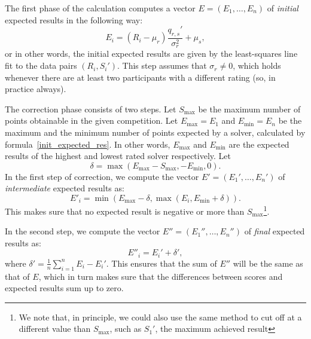 \documentclass{article}
\newcommand{\artg}{\mu_r}
\newcommand{\ascr}{\mu_s}
\newcommand{\vrtg}{\sigma_r}
\newcommand{\cov}{q_{r,s}}
\theoremstyle{definition}
\begin{document}
The first phase of the calculation computes a vector $E=(E_1,\ldots,E_n)$ of \emph{initial} expected results in the following way:
\begin{equation}\label{init_expected_res}
E_i= (R_i - \artg) \frac{\cov'}{\vrtg^2} + \ascr,
\end{equation}
or in other words, the initial expected results are given by the least-squares line fit to the data pairs $(R_i,S_i')$.
This step assumes that $\vrtg\neq 0$, which holds whenever there are at least two participants with a different rating (so, in practice always).

The correction phase consists of two steps.
Let $S_{\max}$ be the maximum number of points obtainable in the given competition.
Let $E_{\max}=E_1$ and $E_{\min}=E_n$ be the maximum and the minimum
number of points expected by a solver,
calculated by formula~\eqref{init_expected_res}.
In other words, $E_{\max}$ and $E_{\min}$ are the expected results
of the highest and lowest rated solver respectively.
Let 
\begin{equation}
\delta = \max(E_{\max}-S_{\max}, -E_{\min}, 0).
\end{equation}
In the first step of correction, we compute the vector $E'=(E_1',\ldots,E_n')$ of \emph{intermediate} expected results as:
\begin{equation}
E'_i = \min (E_{\max}-\delta, \max(E_i, E_{\min}+\delta)).
\end{equation}
This makes sure that no expected result is negative or more than $S_{\max}$\footnote{We note that, in principle, we could also use the same method to cut off at a different value than $S_{\max}$, such as $S_1'$, the maximum achieved result}.

In the second step, we compute the vector $E''=(E_1'',\ldots,E_n'')$ of \emph{final} expected results as:
\begin{equation}
E''_i=E_i' + \delta',
\end{equation}
where $\delta'=\frac{1}{n}\sum_{i=1}^n E_i-E_i'$.
This ensures that the sum of $E''$ will be the same as that of $E$, which in turn makes sure that the differences between scores and expected results sum up to zero.
\end{document}
